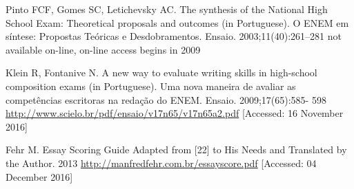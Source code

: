 \documentclass[numbers,sort&compress]{IntechOpen-Book}%
\begin{document}
\begin{backmatter}
\begin{thebibliography}{99}
 Pinto FCF, Gomes SC, Letichevsky
AC. The synthesis of the National High
School Exam: Theoretical proposals
and outcomes (in Portuguese).
O ENEM em síntese: Propostas
Teóricas e Desdobramentos. Ensaio.
2003;11(40):261--281 not available
on-line, on-line access begins in 2009

 Klein R, Fontanive N. A new way
to evaluate writing skills in high-school
composition exams (in Portuguese).
Uma nova maneira de avaliar as
competências escritoras na redação
do ENEM. Ensaio. 2009;17(65):585-
598 \url{http://www.scielo.br/pdf/ensaio/v17n65/v17n65a2.pdf} [Accessed: 16
November 2016]

 Fehr M. Essay Scoring Guide
Adapted from [22] to His Needs and
Translated by the Author. 2013 \url{http://manfredfehr.com.br/essayscore.pdf}
[Accessed: 04 December 2016]

\end{thebibliography}
\end{backmatter}
\end{document}
